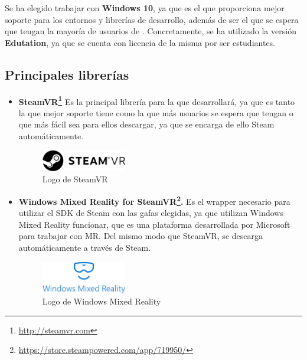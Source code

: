 Se ha elegido trabajar con \textbf{Windows 10}, ya que es el que proporciona mejor soporte para los entornos y librerías de desarrollo, además de ser el que se espera que tengan la mayoría de usuarios de \MineRVa. Concretamente, se ha utilizado la versión \textbf{Edutation}, ya que se cuenta con licencia de la misma por ser estudiantes.

\subsection{Principales librerías}

\begin{itemize}
    \item \textbf{SteamVR\footnote{\url{http://steamvr.com}}} Es la principal librería para la que desarrollará, ya que es tanto la que mejor soporte tiene como la que más usuarios se espera que tengan o que más fácil sea para ellos descargar, ya que se encarga de ello Steam automáticamente.
    
\begin{figure}[!h]
\begin{center}
\includegraphics[width=0.35\textwidth]{imagenes/4/steamvr-logo.jpg}
\caption{Logo de SteamVR}
\label{fig:steamvr-logo}
\end{center}
\end{figure}

    \item \textbf{Windows Mixed Reality for SteamVR\footnote{\url{https://store.steampowered.com/app/719950/}}.} Es el wrapper necesario para utilizar el SDK de Steam con las gafas elegidas, ya que utilizan Windows Mixed Reality funcionar, que es una plataforma desarrollada por Microsoft para trabajar con \acs{MR}. Del mismo modo que SteamVR, se descarga automáticamente a través de Steam.

\begin{figure}[!h]
\begin{center}
\includegraphics[width=0.35\textwidth]{imagenes/4/wmr-logo.jpg}
\caption{Logo de Windows Mixed Reality}
\label{fig:wmr-logo}
\end{center}
\end{figure}


\end{itemize}

